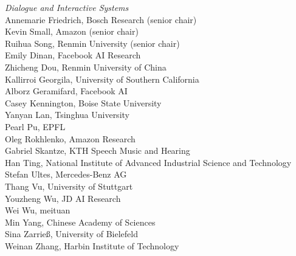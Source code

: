 \emph{Dialogue and Interactive Systems} \\
\hspace*{0.2in} Annemarie Friedrich, Bosch Research (senior chair)\\
\hspace*{0.2in} Kevin Small, Amazon (senior chair)\\
\hspace*{0.2in} Ruihua Song, Renmin University (senior chair)\\
\hspace*{0.2in} Emily Dinan, Facebook AI Research\\
\hspace*{0.2in} Zhicheng Dou, Renmin University of China\\
\hspace*{0.2in} Kallirroi Georgila, University of Southern California \\
\hspace*{0.2in} Alborz Geramifard, Facebook AI \\
\hspace*{0.2in} Casey Kennington, Boise State University\\
\hspace*{0.2in} Yanyan Lan, Tsinghua University\\
\hspace*{0.2in} Pearl Pu, EPFL\\
\hspace*{0.2in} Oleg Rokhlenko, Amazon Research\\
\hspace*{0.2in} Gabriel Skantze, KTH Speech Music and Hearing\\
\hspace*{0.2in} Han Ting, National Institute of Advanced Industrial Science and Technology\\
\hspace*{0.2in} Stefan Ultes, Mercedes-Benz AG\\
\hspace*{0.2in} Thang Vu, University of Stuttgart\\
\hspace*{0.2in} Youzheng Wu, JD AI Research\\
\hspace*{0.2in} Wei Wu, meituan\\
\hspace*{0.2in} Min Yang, Chinese Academy of Sciences\\
\hspace*{0.2in} Sina Zarrie{\ss}, University of Bielefeld\\
\hspace*{0.2in} Weinan Zhang, Harbin Institute of Technology\\

